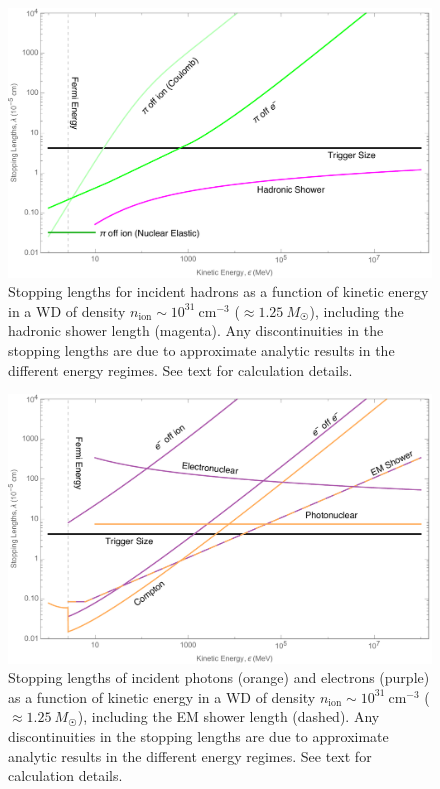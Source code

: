 \documentclass[twocolumn, preprintnumbers,amsmath,amssymb,prd, superscriptaddress]{revtex4}
\begin{document}
\begin{figure}
\includegraphics[scale=.3]{SPhighHad.pdf}
\caption{Stopping lengths for incident hadrons as a function of kinetic energy in a WD of density $n_\text{ion} \sim 10^{31}~\text{cm}^{-3}$ ($\approx 1.25 ~M_{\astrosun}$), including the hadronic shower length (magenta).
Any discontinuities in the stopping lengths are due to approximate analytic results in the different energy regimes.
See text for calculation details.
}
\label{fig:SPhighHad}
\end{figure}

\begin{figure}
\includegraphics[scale=.3]{SPhighEM.pdf}
\caption{Stopping lengths of incident photons (orange) and electrons (purple) as a function of kinetic energy in a WD of density $n_\text{ion} \sim 10^{31}~\text{cm}^{-3}$ ($\approx 1.25 ~M_{\astrosun}$), including the EM shower length (dashed).
Any discontinuities in the stopping lengths are due to approximate analytic results in the different energy regimes.
See text for calculation details.
}
\label{fig:SPhighEM}
\end{figure}
\end{document}
